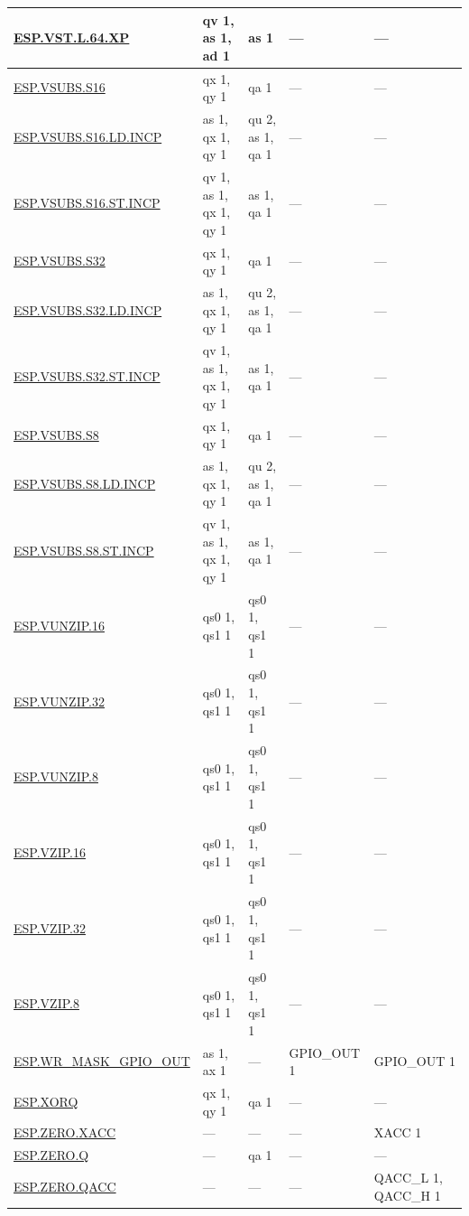 \begin{longtable}[c]{|l|m{2.5cm}|m{2.5cm}|m{2.5cm}|m{2.5cm}|}
    \hyperref[instruction:ESPVSTL64XP]{ESP.VST.L.64.XP} & qv 1, as 1, ad 1 & as 1 & — & — \\\hline
    \hyperref[instruction:ESPVSUBSS16]{ESP.VSUBS.S16} & qx 1, qy 1 & qa 1 & — & — \\\hline
    \hyperref[instruction:ESPVSUBSS16LDINCP]{ESP.VSUBS.S16.LD.INCP} & as 1, qx 1, qy 1 & qu 2, as 1, qa 1 & — & — \\\hline
    \hyperref[instruction:ESPVSUBSS16STINCP]{ESP.VSUBS.S16.ST.INCP} & qv 1, as 1, qx 1, qy 1 & as 1, qa 1 & — & — \\\hline
    \hyperref[instruction:ESPVSUBSS32]{ESP.VSUBS.S32} & qx 1, qy 1 & qa 1 & — & — \\\hline
    \hyperref[instruction:ESPVSUBSS32LDINCP]{ESP.VSUBS.S32.LD.INCP} & as 1, qx 1, qy 1 & qu 2, as 1, qa 1 & — & — \\\hline
    \hyperref[instruction:ESPVSUBSS32STINCP]{ESP.VSUBS.S32.ST.INCP} & qv 1, as 1, qx 1, qy 1 & as 1, qa 1 & — & — \\\hline
    \hyperref[instruction:ESPVSUBSS8]{ESP.VSUBS.S8} & qx 1, qy 1 & qa 1 & — & — \\\hline
    \hyperref[instruction:ESPVSUBSS8LDINCP]{ESP.VSUBS.S8.LD.INCP} & as 1, qx 1, qy 1 & qu 2, as 1, qa 1 & — & — \\\hline
    \hyperref[instruction:ESPVSUBSS8STINCP]{ESP.VSUBS.S8.ST.INCP} & qv 1, as 1, qx 1, qy 1 & as 1, qa 1 & — & — \\\hline
    \hyperref[instruction:ESPVUNZIP16]{ESP.VUNZIP.16} & qs0 1, qs1 1 & qs0 1, qs1 1 & — & — \\\hline
    \hyperref[instruction:ESPVUNZIP32]{ESP.VUNZIP.32} & qs0 1, qs1 1 & qs0 1, qs1 1 & — & — \\\hline
    \hyperref[instruction:ESPVUNZIP8]{ESP.VUNZIP.8} & qs0 1, qs1 1 & qs0 1, qs1 1 & — & — \\\hline
    \hyperref[instruction:ESPVZIP16]{ESP.VZIP.16} & qs0 1, qs1 1 & qs0 1, qs1 1 & — & — \\\hline
    \hyperref[instruction:ESPVZIP32]{ESP.VZIP.32} & qs0 1, qs1 1 & qs0 1, qs1 1 & — & — \\\hline
    \hyperref[instruction:ESPVZIP8]{ESP.VZIP.8} & qs0 1, qs1 1 & qs0 1, qs1 1 & — & — \\\hline
    \hyperref[instruction:ESPWRMASKGPIOOUT]{ESP.WR\_MASK\_GPIO\_OUT} & as 1, ax 1 & — & GPIO\_OUT 1 & GPIO\_OUT 1 \\\hline
    \hyperref[instruction:ESPXORQ]{ESP.XORQ} & qx 1, qy 1 & qa 1 & — & — \\\hline
    \hyperref[instruction:ESPZEROXACC]{ESP.ZERO.XACC} & — & — & — & XACC 1\\\hline
    \hyperref[instruction:ESPZEROQ]{ESP.ZERO.Q} & — & qa 1 & — & — \\\hline
    \hyperref[instruction:ESPZEROQACC]{ESP.ZERO.QACC} & — & — & — & QACC\_L 1, QACC\_H 1\\\hline
\end{longtable}